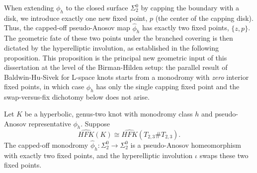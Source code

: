 When extending $\phi_h$ to the closed surface $\Sigma_2^0$ by capping the boundary with a disk, we introduce exactly one new fixed point, $p$ (the center of the capping disk). Thus, the capped-off pseudo-Anosov map $\hat{\phi}_h$ has exactly two fixed points, $\{z, p\}$. The geometric fate of these two points under the branched covering is then dictated by the hyperelliptic involution, as established in the following proposition. This proposition is the principal new geometric input of this dissertation at the level of the Birman-Hilden setup: the parallel result of Baldwin-Hu-Sivek \cite{baldwin2025khovanov} for L-space knots starts from a monodromy with \emph{zero} interior fixed points, in which case $\hat{\phi}_h$ has only the single capping fixed point and the swap-versus-fix dichotomy below does not arise.

\begin{prop}\label{prop:capping off}
Let $K$ be a hyperbolic, genus-two knot with monodromy class $h$ and pseudo-Anosov representative $\phi_h$. Suppose 
\[
\widehat{HFK}(K) \cong \widehat{HFK}(T_{2,3} \# T_{2,3}).
\]
The capped-off monodromy $\hat{\phi}_h \colon \Sigma_2^0 \to \Sigma_2^0$ is a pseudo-Anosov homeomorphism with exactly two fixed points, and the hyperelliptic involution $\iota$ swaps these two fixed points.
\end{prop}

